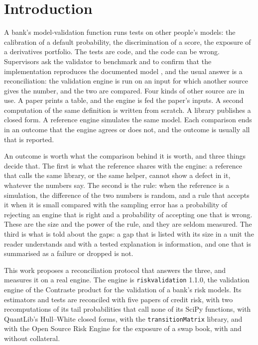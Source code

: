 \section{Introduction}
\label{sec:introduction}

A bank's model-validation function runs tests on other people's models: the calibration of a default probability, the discrimination of a score, the exposure of a derivatives portfolio. The tests are code, and the code can be wrong. Supervisors ask the validator to benchmark and to confirm that the implementation reproduces the documented model \citep{fed2011sr117,ecb2025guide}, and the usual answer is a reconciliation: the validation engine is run on an input for which another source gives the number, and the two are compared. Four kinds of other source are in use. A paper prints a table, and the engine is fed the paper's inputs. A second computation of the same definition is written from scratch. A library publishes a closed form. A reference engine simulates the same model. Each comparison ends in an outcome that the engine agrees or does not, and the outcome is usually all that is reported.

An outcome is worth what the comparison behind it is worth, and three things decide that. The first is what the reference shares with the engine: a reference that calls the same library, or the same helper, cannot show a defect in it, whatever the numbers say. The second is the rule: when the reference is a simulation, the difference of the two numbers is random, and a rule that accepts it when it is small compared with the sampling error has a probability of rejecting an engine that is right and a probability of accepting one that is wrong. These are the size and the power of the rule, and they are seldom measured. The third is what is told about the gaps: a gap that is listed with its size in a unit the reader understands and with a tested explanation is information, and one that is summarised as a failure or dropped is not.

This work proposes a reconciliation protocol that answers the three, and measures it on a real engine. The engine is \texttt{riskvalidation} 1.1.0, the validation engine of the Contraste product for the validation of a bank's risk models. Its estimators and tests are reconciled with five papers of credit risk, with two recomputations of its tail probabilities that call none of its SciPy functions, with QuantLib's Hull--White closed forms, with the \texttt{transitionMatrix} library, and with the Open Source Risk Engine for the exposure of a swap book, with and without collateral.

